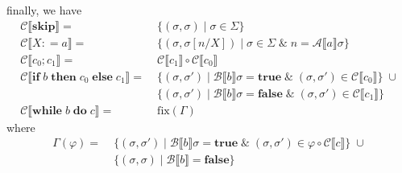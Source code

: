 \documentclass[12pt,aspectratio=169]{beamer}
\newcommand{\Com}{\mathbf{Com}}
\newcommand{\denoA}[1]{\mathcal{A} \llbracket #1 \rrbracket}
\newcommand{\denoB}[1]{\mathcal{B} \llbracket #1 \rrbracket}
\newcommand{\denoC}[1]{\mathcal{C} \llbracket #1 \rrbracket}
\newcommand{\true}{\mathbf{true}}
\newcommand{\false}{\mathbf{false}}
\newcommand{\Skip}{\mathbf{skip}}
\def\coloneqq{\mathrel{\mathop:}=}
\newcommand{\Assign}[2]{#1 \coloneqq #2}
\newcommand{\ITE}[3]{\mathbf{if}\; #1 \; \mathbf{then} \; #2 \; \mathbf{else} \; #3}
\newcommand{\While}[2]{\mathbf{while}\; #1 \; \mathbf{do} \; #2}
\begin{document}
\begin{frame}
    finally, we have
    \begin{align*}
        \denoC{\Skip} =& \;\{(\sigma,\sigma) \mid \sigma \in \Sigma\}\\
        \denoC{\Assign{X}{a}} =& \;\{(\sigma,\sigma[n/X]) \mid \sigma \in \Sigma \; \& \; n = \denoA{a}\sigma\}\\
        \denoC{c_0;c_1} =& \;\denoC{c_1} \circ \denoC{c_0}\\
        \denoC{\ITE{b}{c_0}{c_1}} =& \;
            \{(\sigma,\sigma') \mid \denoB{b}\sigma = \true \; \& \; (\sigma, \sigma') \in \denoC{c_0}\} \; \cup\\
            & \;\{(\sigma,\sigma') \mid \denoB{b}\sigma = \false \; \& \; (\sigma, \sigma') \in \denoC{c_1}\}\\
        \denoC{\While{b}{c}} = & \; \mathrm{fix}(\Gamma)
    \end{align*}
    where
    \begin{align*}
        \Gamma(\varphi) = & \; \{ (\sigma, \sigma') \mid \denoB{b}\sigma = \true \; \& \; (\sigma, \sigma') \in \varphi \circ \denoC{c}\} \; \cup \\
        & \; \{(\sigma,\sigma) \mid \denoB{b} = \false \}
    \end{align*}
\end{frame}
\end{document}
